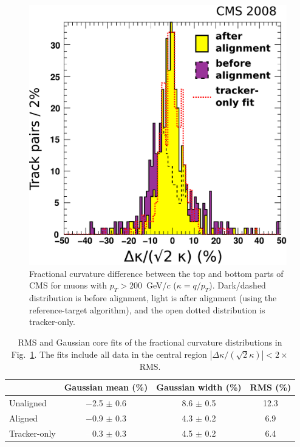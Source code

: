 \begin{figure}[p]
  \centering
  \includegraphics[width=0.48\linewidth]{plots/gma_hip_results/onlyhip.pdf}
  \caption{Fractional curvature difference between the top and bottom
  parts of CMS for muons with $p_T > 200$~GeV/$c$ ($\kappa = q/p_T$).
  Dark/dashed distribution is before alignment, light is after
  alignment (using the reference-target algorithm), and the open
  dotted distribution is tracker-only. \label{fig:chargesplitting}}
\end{figure}

\begin{table}[p]
\caption{RMS and Gaussian core fits of the fractional curvature
  distributions in Fig.~\ref{fig:chargesplitting}.  The fits include
  all data in the central region
  $\left|\Delta \kappa/(\sqrt{2}\kappa)\right| <
  2\times$RMS. \label{tab:chargesplitting}}

\begin{center}
\renewcommand{\arraystretch}{1.5}
\begin{tabular}{l c c c}
\hline\hline & \hspace{0.25 cm}Gaussian mean (\%)\hspace{0.25 cm} & \hspace{0.25 cm}Gaussian width (\%)\hspace{0.25 cm} & \hspace{0.25 cm}RMS (\%)\hspace{0.25 cm} \\\hline
Unaligned & $-$2.5 $\pm$ 0.6 & 8.6 $\pm$ 0.5 & 12.3 \\
Aligned & $-$0.9 $\pm$ 0.3 & 4.3 $\pm$ 0.2 & 6.9 \\\hline
Tracker-only & \textcolor{white}{$-$}0.3 $\pm$ 0.3 & 4.5 $\pm$ 0.2 & 6.4 \\\hline\hline
\end{tabular}
\end{center}
\end{table}


